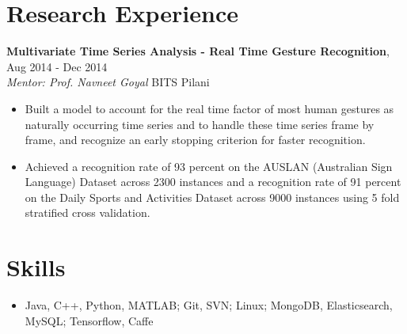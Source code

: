 \documentclass[letterpaper]{article}
\begin{document}
\section*{Research Experience}
\textbf{Multivariate Time Series Analysis - Real Time Gesture Recognition},  \hfill
Aug 2014 - Dec 2014
\\ \emph{Mentor: Prof. Navneet Goyal} \hfill
BITS Pilani\\
\vspace{-6mm}
\begin{itemize}
\item Built a model to account for the real time factor of most human gestures as naturally occurring time series and to handle these time series frame by frame, and recognize an early stopping criterion for faster recognition. 
\vspace{-2mm}
\item Achieved a recognition rate of 93 percent on the AUSLAN (Australian Sign Language) Dataset across 2300 instances and a recognition rate of 91 percent on the Daily Sports and Activities Dataset across 9000 instances using 5 fold stratified cross validation.
\end{itemize}

\section*{Skills}
\begin{itemize}
\item Java, C++, Python, MATLAB; Git, SVN; Linux; MongoDB, Elasticsearch, MySQL; Tensorflow, Caffe
\end{itemize}
\end{document}
